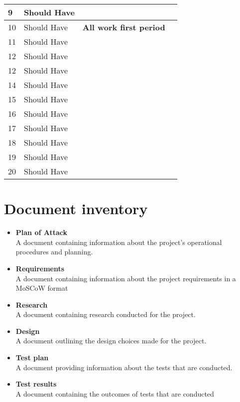 \documentclass{article} %
\begin{document}
\begin{tabularx}{\textwidth}{|X|X|X|X|}
    9 & Should Have &  \\ \hline
    10 & Should Have & \textbf{All work first period} \\ \hline
    11 & Should Have &  \\ \hline
    12 & Should Have &  \\ \hline
    12 & Should Have &  \\ \hline
    14 & Should Have &  \\ \hline
    15 & Should Have &  \\ \hline
    16 & Should Have &  \\ \hline
    17 & Should Have &  \\ \hline
    18 & Should Have &  \\ \hline
    19 & Should Have &  \\ \hline
    20 & Should Have &  \\ \hline
    \end{tabularx}
    \newpage

    \section{Document inventory}
    \begin{itemize}
        \item \textbf{Plan of Attack}
        \\
        A document containing information about the project's operational procedures and planning.
        \item \textbf{Requirements}
        \\
        A document containing information about the project requirements in a MoSCoW format
        \item \textbf{Research}
        \\
        A document containing research conducted for the project.
        \item \textbf {Design}
        \\
        A document outlining the design choices made for the project.
        \item \textbf {Test plan}
        \\
        A document providing information about the tests that are conducted.
        \item \textbf {Test results}
        \\
        A document containing the outcomes of tests that are conducted
    \end{itemize}
\end{document}
